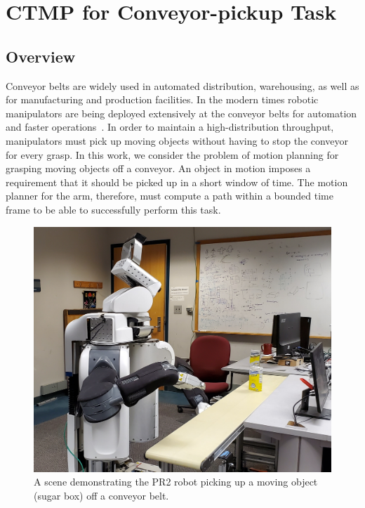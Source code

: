 \documentclass[a4paper]{report}
\begin{document}
\newpage
\chapter{CTMP for Conveyor-pickup Task}
\label{chap:rss}
\section{Overview}
Conveyor belts are widely used in automated distribution, warehousing, as well as for manufacturing and production facilities. In the modern times robotic manipulators are being deployed extensively at the conveyor belts for automation and faster operations~\cite{zhang2018gilbreth}. In order to maintain a high-distribution throughput, manipulators must pick up moving objects without having to stop the conveyor for every grasp. In this work, we consider the problem of motion planning for grasping moving objects off a conveyor. An object in motion imposes a requirement that it should be picked up in a short window of time. The motion planner for the arm, therefore, must compute a path within a bounded time frame to be able to successfully perform this task.

\begin{figure}[t]
    \centering
    \includegraphics[trim=0 50 0 100, clip, width=\columnwidth]{figs/cover_pic.jpg}
    \caption{
    \CaptionTextSize
    A scene demonstrating the PR2 robot picking up a moving object (sugar box) off a conveyor belt.}
    \label{fig:intro_pic}
\end{figure}
\end{document}
